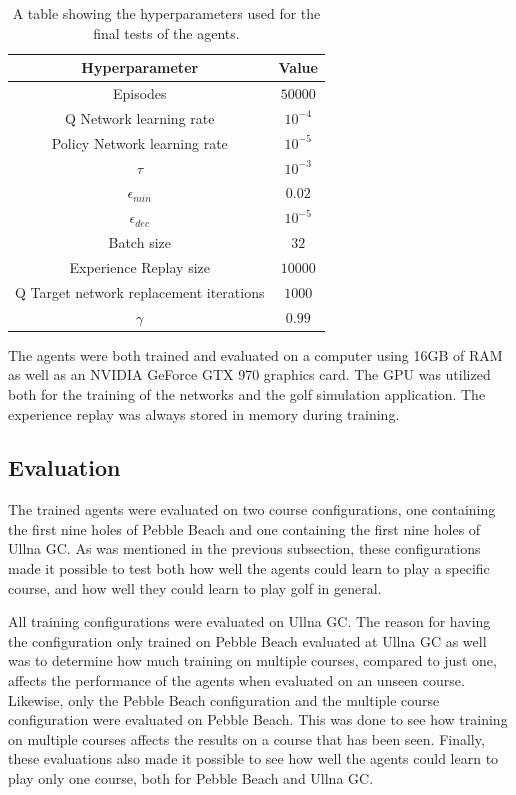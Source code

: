 \documentclass{kththesis}
\begin{document}
\begin{table}
    \centering
    \begin{tabular}{|c|c|}
        \hline
        \textbf{Hyperparameter} & \textbf{Value} \\ \hline
        Episodes & $50000$ \\ \hline
        Q Network learning rate & $10^{-4}$ \\ \hline
        Policy Network learning rate & $10^{-5}$ \\ \hline
        $\tau$ & $10^{-3}$ \\ \hline
        $\epsilon_{min}$ & $0.02$ \\ \hline
        $\epsilon_{dec}$ & $10^{-5}$ \\ \hline
        Batch size & $32$ \\ \hline
        Experience Replay size & $10000$ \\ \hline
        Q Target network replacement iterations & $1000$ \\ \hline
        $\gamma$ & $0.99$ \\ \hline
    \end{tabular}
    \caption{A table showing the hyperparameters used for the final tests of the agents.}
    \label{tab:hyperparameters}
\end{table}

The agents were both trained and evaluated on a computer using 16GB of RAM as well as an NVIDIA GeForce GTX 970 graphics card. The GPU was utilized both for the training of the networks and the golf simulation application. The experience replay was always stored in memory during training.

\subsection{Evaluation}
The trained agents were evaluated on two course configurations, one containing the first nine holes of Pebble Beach and one containing the first nine holes of Ullna GC. As was mentioned in the previous subsection, these configurations made it possible to test both how well the agents could learn to play a specific course, and how well they could learn to play golf in general.

All training configurations were evaluated on Ullna GC. The reason for having the configuration only trained on Pebble Beach evaluated at Ullna GC as well was to determine how much training on multiple courses, compared to just one, affects the performance of the agents when evaluated on an unseen course. Likewise, only the Pebble Beach configuration and the multiple course configuration were evaluated on Pebble Beach. This was done to see how training on multiple courses affects the results on a course that has been seen. Finally, these evaluations also made it possible to see how well the agents could learn to play only one course, both for Pebble Beach and Ullna GC.
\end{document}
